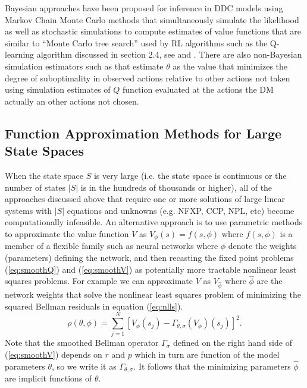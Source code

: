 Bayesian approaches have been proposed for inference in DDC models using Markov Chain Monte Carlo methods that simultaneously
simulate the likelihood as well as stochastic simulations to compute estimates of value functions that are similar to
``Monte Carlo tree search'' used by RL algorithms such as the Q-learning algorithm discussed in section 2.4, 
see \citet{ijc:2009} and \citet{norets:2009}. There are also non-Bayesian simulation estimators such as
\citet{bbl:2007} that estimate $\theta$ as the value that minimizes the degree of suboptimality 
in observed actions relative to other actions not taken  using simulation estimates of $Q$ function evaluated at the actions
the DM actually an other actions not chosen.

\subsection{Function Approximation Methods for Large State Spaces}

When the state space $S$ is very large (i.e. the state space is continuous
or the number of states $|S|$ is in the hundreds of thousands
or higher), all of the approaches discussed above that require one or more solutions 
of large linear systems with $|S|$ equations and unknowns (e.g. NFXP, CCP, NPL, etc) become computationally infeasible. 
An alternative approach is to use parametric methods to approximate the value function $V$  as $V_\phi(s)=f(s,\phi)$
where $f(s,\phi)$ is a member of a flexible family such as neural networks where $\phi$ denote the weights (parameters)
defining the network, and then recasting 
the fixed point problems (\ref{eq:smoothQ}) and (\ref{eq:smoothV}) as potentially 
more tractable nonlinear least squares problems.  For example we can approximate $V$ as $V_{\hat\phi}$ where $\hat\phi$ are
the network weights that solve the  nonlinear least squares problem of minimizing the squared Bellman residuals in 
equation (\ref{eq:nlls}). 
\begin{equation}
 \rho(\theta,\phi) = \sum_{j=1}^N  [V_\phi(s_j)-\Gamma_{\theta,\sigma}(V_\phi)(s_j)]^2.
\label{eq:nlls1}
\end{equation}
Note that the smoothed Bellman operator $\Gamma_\sigma$ defined on the right hand
side of (\ref{eq:smoothV}) depends on $r$ and $p$ which in turn are function of the model parameters $\theta$, so we write it as
$\Gamma_{\theta,\sigma}$. It follows that the minimizing parameters $\hat\phi$ are implicit functions of $\theta$. 

